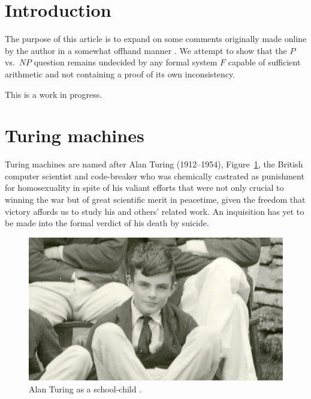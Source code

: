 \documentclass[letterpaper]{article}
\begin{document}
\section{Introduction}
The purpose of this article is to expand on some comments originally made online by the author in a somewhat offhand manner \cite{myinfo2016,myinfo2016a,annorlunda2016}.  We attempt to show that the $P$ vs.\ $NP$ question remains undecided by any formal system $F$ capable of sufficient arithmetic and not containing a proof of its own inconsistency.

This is a work in progress.



\section{Turing machines}
Turing machines are named after Alan Turing (1912--1954), Figure~\ref{turing}, the British computer scientist and code-breaker who was chemically castrated as punishment for homosexuality in spite of his valiant efforts that were not only crucial to winning the war but of great scientific merit in peacetime, given the freedom that victory affords us to study his and others' related work.  An inquisition has yet to be made into the formal verdict of his death by suicide.
\begin{figure}
	\centering
	\includegraphics[width=1\textwidth]{alan-turing-school-photo.jpg}
	\caption[Alan Turing]{Alan Turing as a school-child \cite{hodges2017}.}
	\label{turing}
\end{figure}
\end{document}
